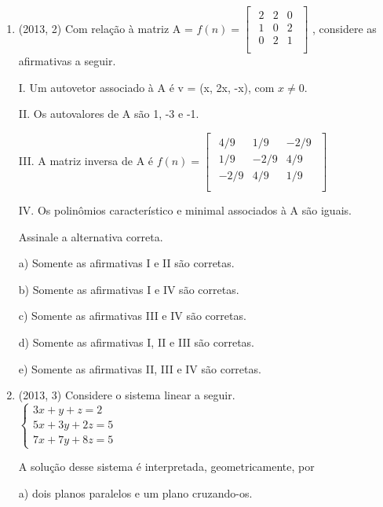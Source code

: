 \documentclass{article}
\begin{document}
\begin{enumerate}
\item(2013, 2) Com relação à matriz A =
$
f(n) = \left [ \begin{matrix} 
    \begin{array}{cccc}
    2 & 2 & 0 \\
    1 & 0 & 2 \\
    0 & 2 & 1 \\
\end{array}
\end{matrix} \right ]$ 
, considere as afirmativas a seguir.

I. Um autovetor associado à A é v = (x, 2x, -x), com $x \ne 0.$

II. Os autovalores de A são 1, -3 e -1.

III. A matriz inversa de A é
$
f(n) = \left [ \begin{matrix} 
    \begin{array}{cccc}
    4/9 & 1/9 & -2/9 \\
    1/9 & -2/9 & 4/9 \\
    -2/9 & 4/9 & 1/9 \\
\end{array}
\end{matrix} \right ]$ 

IV. Os polinômios característico e minimal associados à A são iguais.

Assinale a alternativa correta.

a) Somente as afirmativas I e II são corretas.

b) Somente as afirmativas I e IV são corretas.

c) Somente as afirmativas III e IV são corretas.

d) Somente as afirmativas I, II e III são corretas.

e) Somente as afirmativas II, III e IV são corretas.\newline



\item(2013, 3) Considere o sistema linear a seguir.\\
$
\left \{ \begin{matrix} 
        3x + y + z = 2\\
        5x + 3y + 2z = 5\\
        7x + 7y + 8z = 5
\end{matrix} \right.$ 

A solução desse sistema é interpretada, geometricamente, por

a) dois planos paralelos e um plano cruzando-os.


\end{enumerate}
\end{document}

